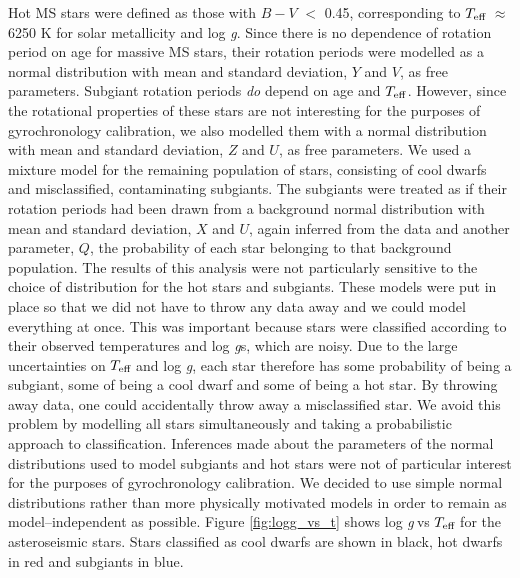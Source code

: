 \documentclass[useAMS, usenatbib]{mn2e}
\newcommand{\logg}{log \emph{g}}
\newcommand{\teff}{$T_{\rm{eff}}$}
\begin{document}
Hot MS stars were defined as those with $B-V$ $<$ 0.45, corresponding to
\teff$~\approx$ 6250 K for solar metallicity and \logg.
Since there is no dependence of rotation period on age for massive MS stars,
their rotation periods were modelled as a normal distribution with mean and
standard deviation, $Y$ and $V$, as free parameters.
Subgiant rotation periods \emph{do} depend on age and $T_{\rm{eff}}$.
However, since the rotational properties of these stars are not interesting for
the purposes of gyrochronology calibration, we also modelled them with
a normal distribution with mean and standard deviation, $Z$ and $U$, as free
parameters.
We used a mixture model for the remaining population of stars, consisting of
cool dwarfs and misclassified, contaminating subgiants.
The subgiants were treated as if their rotation periods had been drawn from
a background normal distribution with mean and standard deviation, $X$ and
$U$, again inferred from the data and another parameter, $Q$, the
probability of each star belonging to that background population.
The results of this analysis were not particularly sensitive to the choice of
distribution for the hot stars and subgiants.
These models were put in place so that we did not have to throw any data
away and we could model everything at once.
This was important because stars were classified according to their observed
temperatures and \logg s, which are noisy.
Due to the large uncertainties on \teff$~$and \logg, each star therefore has some
probability of being a subgiant, some of being a cool dwarf and some of
being a hot star.
By throwing away data, one could accidentally throw away a misclassified star.
We avoid this problem by modelling all stars simultaneously and taking a
probabilistic approach to classification.
Inferences made about the parameters of the normal distributions used to model
subgiants and hot stars were not of particular interest for the purposes of
gyrochronology calibration.
We decided to use simple normal distributions rather than more physically
motivated models in order to remain as model--independent as
possible.
Figure \ref{fig:logg_vs_t} shows \logg$~$vs \teff$~$for the asteroseismic stars.
Stars classified as cool dwarfs are shown in black, hot dwarfs in red and
subgiants in blue.
\end{document}
